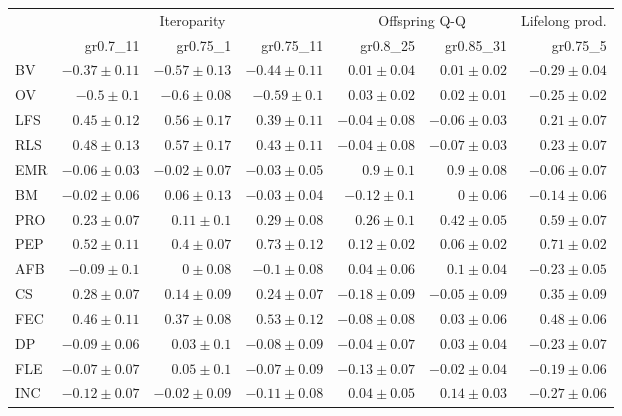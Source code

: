 \begin{landscape}
\begin{table}
\begin{footnotesize}
\begin{tabular}{@{}l|rrr|rr|r@{}}
\toprule
 & \multicolumn{3}{c|}{Iteroparity} & \multicolumn{2}{c|}{Offspring Q-Q} & \multicolumn{1}{c}{Lifelong prod.}\\
 & gr0.7\_11 & gr0.75\_1 & gr0.75\_11 & gr0.8\_25 & gr0.85\_31 & gr0.75\_5\\
\midrule
BV & $-0.37 \pm 0.11$ & $-0.57 \pm 0.13$ & $-0.44 \pm 0.11$ & $0.01 \pm 0.04$ & $0.01 \pm 0.02$ & $-0.29 \pm 0.04$\\
OV & $-0.5 \pm 0.1$ & $-0.6 \pm 0.08$ & $-0.59 \pm 0.1$ & $0.03 \pm 0.02$ & $0.02 \pm 0.01$ & $-0.25 \pm 0.02$\\
LFS & $0.45 \pm 0.12$ & $0.56 \pm 0.17$ & $0.39 \pm 0.11$ & $-0.04 \pm 0.08$ & $-0.06 \pm 0.03$ & $0.21 \pm 0.07$\\
RLS & $0.48 \pm 0.13$ & $0.57 \pm 0.17$ & $0.43 \pm 0.11$ & $-0.04 \pm 0.08$ & $-0.07 \pm 0.03$ & $0.23 \pm 0.07$\\
EMR & $-0.06 \pm 0.03$ & $-0.02 \pm 0.07$ & $-0.03 \pm 0.05$ & $0.9 \pm 0.1$ & $0.9 \pm 0.08$ & $-0.06 \pm 0.07$\\
BM & $-0.02 \pm 0.06$ & $0.06 \pm 0.13$ & $-0.03 \pm 0.04$ & $-0.12 \pm 0.1$ & $0 \pm 0.06$ & $-0.14 \pm 0.06$\\
PRO & $0.23 \pm 0.07$ & $0.11 \pm 0.1$ & $0.29 \pm 0.08$ & $0.26 \pm 0.1$ & $0.42 \pm 0.05$ & $0.59 \pm 0.07$\\
PEP & $0.52 \pm 0.11$ & $0.4 \pm 0.07$ & $0.73 \pm 0.12$ & $0.12 \pm 0.02$ & $0.06 \pm 0.02$ & $0.71 \pm 0.02$\\
AFB & $-0.09 \pm 0.1$ & $0 \pm 0.08$ & $-0.1 \pm 0.08$ & $0.04 \pm 0.06$ & $0.1 \pm 0.04$ & $-0.23 \pm 0.05$\\
CS & $0.28 \pm 0.07$ & $0.14 \pm 0.09$ & $0.24 \pm 0.07$ & $-0.18 \pm 0.09$ & $-0.05 \pm 0.09$ & $0.35 \pm 0.09$\\
FEC & $0.46 \pm 0.11$ & $0.37 \pm 0.08$ & $0.53 \pm 0.12$ & $-0.08 \pm 0.08$ & $0.03 \pm 0.06$ & $0.48 \pm 0.06$\\
DP & $-0.09 \pm 0.06$ & $0.03 \pm 0.1$ & $-0.08 \pm 0.09$ & $-0.04 \pm 0.07$ & $0.03 \pm 0.04$ & $-0.23 \pm 0.07$\\
FLE & $-0.07 \pm 0.07$ & $0.05 \pm 0.1$ & $-0.07 \pm 0.09$ & $-0.13 \pm 0.07$ & $-0.02 \pm 0.04$ & $-0.19 \pm 0.06$\\
INC & $-0.12 \pm 0.07$ & $-0.02 \pm 0.09$ & $-0.11 \pm 0.08$ & $0.04 \pm 0.05$ & $0.14 \pm 0.03$ & $-0.27 \pm 0.06$\\
\bottomrule
\end{tabular}


\end{footnotesize}
\end{table}
\end{landscape}
